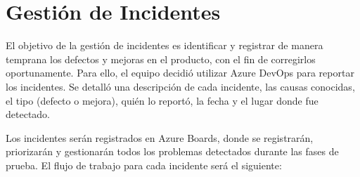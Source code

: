 \section{Gestión de Incidentes}\label{sec:gestionDeIncidentes}

El objetivo de la gestión de incidentes es identificar y registrar de manera temprana los defectos y mejoras en el producto, 
con el fin de corregirlos oportunamente. Para ello, el equipo decidió utilizar Azure DevOps para reportar los incidentes. Se detalló una 
descripción de cada incidente, las causas conocidas, el tipo (defecto o mejora), quién lo reportó, la fecha y el lugar donde fue detectado.

Los incidentes serán registrados en Azure Boards, donde se registrarán, priorizarán y gestionarán todos los problemas detectados 
durante las fases de prueba. El flujo de trabajo para cada incidente será el siguiente:

